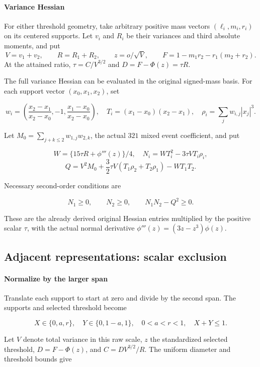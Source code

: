 \paragraph{Variance Hessian}
For either threshold geometry, take arbitrary positive mass vectors
$(\ell_i,m_i,r_i)$ on its centered supports. Let $v_i$ and $R_i$
be their variances and third absolute moments, and put
\[
 V=v_1+v_2,\qquad R=R_1+R_2,\qquad z=o/\sqrt V,\qquad
 F=1-m_1r_2-r_1(m_2+r_2).
\]
At the attained ratio, $\tau=C/V^{3/2}$ and $D=F-\Phi(z)=\tau R$.

The full variance Hessian can be evaluated in the original signed-mass
basis. For each support vector $(x_0,x_1,x_2)$, set

\[
 w_i=\left(\frac{x_2-x_1}{x_2-x_0},-1,
             \frac{x_1-x_0}{x_2-x_0}\right),\quad
 T_i=(x_1-x_0)(x_2-x_1),\quad
 \rho_i=\sum_jw_{i,j}|x_j|^3.
\]

Let $M_0=\sum_{j+k\le 2}w_{1,j}w_{2,k}$, the actual $321$ mixed event
coefficient, and put

\[
 W=\{15\tau R+\phi'''(z)\}/4,
\quad N_i=WT_i^2-3\tau VT_i\rho_i,
\]
\[
 Q=V^2M_0+\frac32\tau V(T_1\rho_2+T_2\rho_1)-WT_1T_2.
\]

Necessary second-order conditions are

\[
 N_1\geq0,\qquad N_2\geq0,\qquad N_1N_2-Q^2\geq0.
\tag{B.28.5}\label{contact:two-owner-321-contact-reduction-21}
\]

These are the already derived original Hessian entries multiplied by the
positive scalar $\tau$, with the actual normal derivative
$\phi'''(z)=(3z-z^3)\phi(z)$.

\subsection{Adjacent representations: scalar exclusion}\label{contact:adjacent-owner-321-scalar-reduction}


\paragraph{Normalize by the larger span}

Translate each support to start at zero and divide by the second span. The
supports and selected threshold become

\[
 X\in\{0,a,r\},\quad Y\in\{0,1-a,1\},\quad
 0<a<r<1,\quad X+Y\le1.
\tag{B.29.1}\label{contact:adjacent-owner-321-scalar-reduction-1}
\]

Let $V$ denote total variance in this raw scale, $z$ the standardized
selected threshold, $D=F-\Phi(z)$, and $C=D V^{3/2}/R$. The uniform
diameter and threshold bounds give

